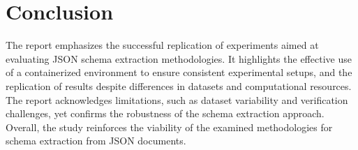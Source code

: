 \documentclass[sigconf, nonacm]{acmart}
\begin{document}
\section{Conclusion}
The report emphasizes the successful replication of experiments aimed at evaluating JSON schema extraction methodologies. It highlights the effective use of a containerized environment to ensure consistent experimental setups, and the replication of results despite differences in datasets and computational resources. The report acknowledges limitations, such as dataset variability and verification challenges, yet confirms the robustness of the schema extraction approach. Overall, the study reinforces the viability of the examined methodologies for schema extraction from JSON documents.



\end{document}
